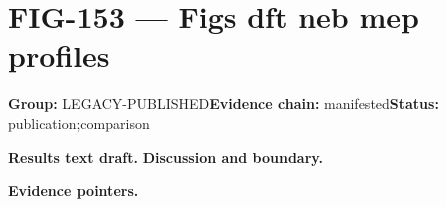 \clearpage
\section{FIG-153 --- Figs dft neb mep profiles}
\label{figpage:fig-153}
\textbf{Group:} LEGACY-PUBLISHED\quad \textbf{Evidence chain:} manifested\quad \textbf{Status:} publication;comparison

\textbf{Results text draft.} 
\textbf{Discussion and boundary.} 


\textbf{Evidence pointers.}



\vfill
